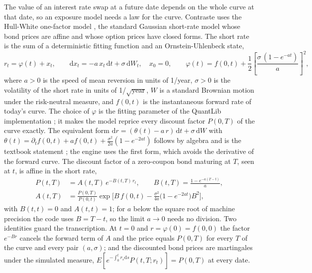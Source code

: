 The value of an interest rate swap at a future date depends on the whole curve at that date, so an exposure model needs a law for the
curve. Contraste uses the Hull-White one-factor model \citep{ccr:hullwhite1990}, the standard Gaussian short-rate model whose bond
prices are affine and whose option prices have closed forms. The short rate is the sum of a deterministic fitting function and an
Ornstein-Uhlenbeck state,
\begin{equation}
r_t=\varphi(t)+x_t,\qquad \mathrm{d}x_t=-a\,x_t\,\mathrm{d}t+\sigma\,\mathrm{d}W_t,\quad x_0=0,\qquad
\varphi(t)=f(0,t)+\frac{1}{2}\left[\frac{\sigma\,(1-e^{-at})}{a}\right]^{2},
\label{eq:ccr-hw}
\end{equation}
where $a>0$ is the speed of mean reversion in units of 1/year, $\sigma>0$ is the volatility of the short rate in units of
1/$\sqrt{\text{year}}$, $W$ is a standard Brownian motion under the risk-neutral measure, and $f(0,t)$ is the instantaneous forward rate
of today's curve. The choice of $\varphi$ is the fitting parameter of the QuantLib implementation \citep{ccr:quantlib}; it makes the model
reprice every discount factor $P(0,T)$ of the curve exactly. The equivalent form $\mathrm{d}r=(\theta(t)-a\,r)\,\mathrm{d}t+\sigma\,\mathrm{d}W$
with $\theta(t)=\partial_t f(0,t)+a f(0,t)+\frac{\sigma^2}{2a}(1-e^{-2at})$ follows by algebra and is the textbook statement
\citep{ccr:brigomercurio2006}; the engine uses the first form, which avoids the derivative of the forward curve. The discount factor
of a zero-coupon bond maturing at $T$, seen at $t$, is affine in the short rate,
\begin{equation}
\begin{aligned}
P(t,T)&=A(t,T)\,e^{-B(t,T)\,r_t},\qquad B(t,T)=\frac{1-e^{-a(T-t)}}{a},\\
A(t,T)&=\frac{P(0,T)}{P(0,t)}\exp\!\Big[B\,f(0,t)-\frac{\sigma^2}{4a}\big(1-e^{-2at}\big)B^2\Big],
\end{aligned}
\label{eq:ccr-bond}
\end{equation}
with $B(t,t)=0$ and $A(t,t)=1$; for $a$ below the square root of machine precision the code uses $B=T-t$, so the limit $a\to0$ needs no
division. Two identities guard the transcription. At $t=0$ and $r=\varphi(0)=f(0,0)$ the factor $e^{-Br}$ cancels the forward term of
$A$ and the price equals $P(0,T)$ for every $T$ of the curve and every pair $(a,\sigma)$; and the discounted bond prices are martingales
under the simulated measure, $E[e^{-\int_0^t r_s\mathrm{d}s}P(t,T;r_t)]=P(0,T)$ at every date.

